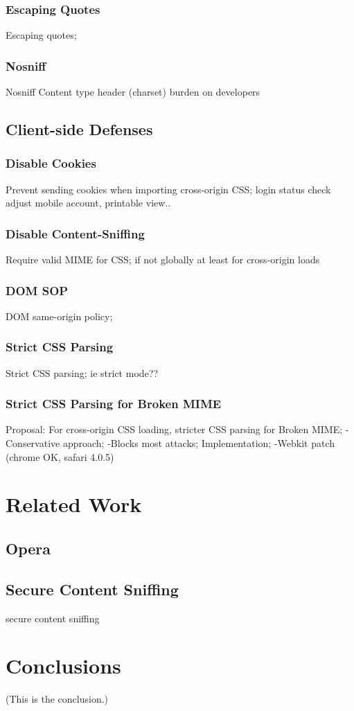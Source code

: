 \documentclass{acm_proc_article-sp}
\begin{document}
\subsubsection{Escaping Quotes}
Escaping quotes;
\subsubsection{Nosniff}
Nosniff
Content type header (charset)
burden on developers

\subsection{Client-side Defenses}
\subsubsection{Disable Cookies}
Prevent sending cookies when importing cross-origin CSS;
login status check
adjust mobile account, printable view..

\subsubsection{Disable Content-Sniffing}
Require valid MIME for CSS; if not globally at least for cross-origin loads

\subsubsection{DOM SOP}
DOM same-origin policy;

\subsubsection{Strict CSS Parsing}
Strict CSS parsing;
ie strict mode??

\subsubsection{Strict CSS Parsing for Broken MIME}
Proposal: For cross-origin CSS loading, stricter CSS parsing for Broken MIME;
-Conservative approach;
-Blocks most attacks;
Implementation;
-Webkit patch (chrome OK, safari 4.0.5)

\section{Related Work}

\subsection{Opera}

\subsection{Secure Content Sniffing}
secure content sniffing\cite{securecontentsniffing}

\section{Conclusions}
(This is the conclusion.)



\end{document}

